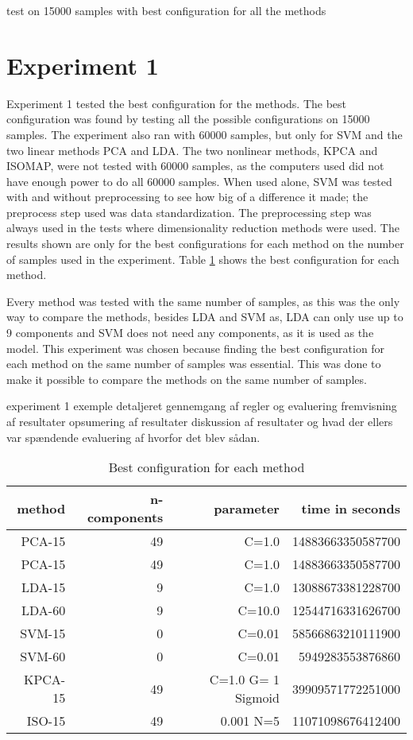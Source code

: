 test on 15000 samples with best configuration for all the methods


\section{Experiment 1}\label{sec:experiment-1}
Experiment 1 tested the best configuration for the methods. The best configuration was found by testing all the possible configurations on 15000 samples. The experiment also ran with 60000 samples, but only for SVM and the two linear methods PCA and LDA. The two nonlinear methods, KPCA and ISOMAP, were not tested with 60000 samples, as the computers used did not have enough power to do all 60000 samples. When used alone, SVM was tested with and without preprocessing to see how big of a difference it made; the preprocess step used was data standardization. The preprocessing step was always used in the tests where dimensionality reduction methods were used. The results shown are only for the best configurations for each method on the number of samples used in the experiment. Table \ref{tab:best-configuration} shows the best configuration for each method.

Every method was tested with the same number of samples, as this was the only way to compare the methods, besides LDA and SVM as, LDA can only use up to 9 components and SVM does not need any components, as it is used as the model.
This experiment was chosen because finding the best configuration for each method on the same number of samples was essential. This was done to make it possible to compare the methods on the same number of samples. 


experiment 1 exemple
    detaljeret gennemgang af regler og evaluering
    fremvisning af resultater
    opsumering af resultater
    diskussion af resultater og hvad der ellers var spændende evaluering af hvorfor det blev sådan.




\begin{table}[htb!]   
\centering
\caption{Best configuration for each method}
\label{tab:best-configuration}
\begin{tabular}{rrrr}
    \toprule
    method & n-components & parameter & time in seconds \\
    \midrule
    PCA-15 & 49 & C=1.0 & 14883663350587700 \\
    PCA-15 & 49 & C=1.0 & 14883663350587700  \\
    LDA-15 & 9 & C=1.0 & 13088673381228700 \\
    LDA-60 & 9 & C=10.0 & 12544716331626700 \\
    SVM-15 & 0 & C=0.01 & 58566863210111900 \\
    SVM-60 & 0 & C=0.01 & 5949283553876860 \\
    KPCA-15 & 49 & C=1.0 G= 1 Sigmoid & 39909571772251000 \\
    ISO-15 & 49 & 0.001 N=5 & 11071098676412400 \\
    \bottomrule
\end{tabular}
\end{table}

